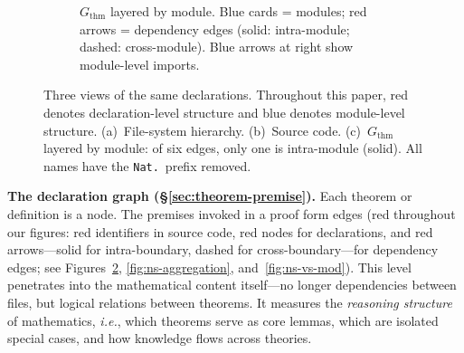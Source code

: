 \begin{figure}[!htb]
\begin{subfigure}[b]{\textwidth}
\caption{$G_{\mathrm{thm}}$ layered by module. \textcolor{blue!60!black}{Blue cards} = modules; \textcolor{red!70!black}{red arrows} = dependency edges (solid: intra-module; dashed: cross-module). \textcolor{blue!60!black}{Blue arrows} at right show module-level imports.}
\label{fig:dep-view}
\end{subfigure}
\caption{Three views of the same declarations. Throughout this paper, \textcolor{red!70!black}{red} denotes declaration-level structure and \textcolor{blue!60!black}{blue} denotes module-level structure. (a)~File-system hierarchy. (b)~Source code. (c)~$G_{\mathrm{thm}}$ layered by module: of six edges, only one is intra-module (solid). All names have the \texttt{Nat.}\ prefix removed.}
\label{fig:module-region}
\end{figure}

\medskip
\noindent\textbf{The declaration graph (\S\ref{sec:theorem-premise}).}
Each theorem or definition is a node. The premises invoked in a proof form edges (\textcolor{red!70!black}{red} throughout our figures: \textcolor{red!70!black}{red identifiers} in source code, \textcolor{red!70!black}{red nodes} for declarations, and \textcolor{red!70!black}{red arrows}---solid for intra-boundary, dashed for cross-boundary---for dependency edges; see Figures~\ref{fig:module-region}, \ref{fig:ns-aggregation}, and~\ref{fig:ns-vs-mod}). This level penetrates into the mathematical content itself---no longer dependencies between files, but logical relations between theorems. It measures the \emph{reasoning structure} of mathematics, \emph{i.e.}, which theorems serve as core lemmas, which are isolated special cases, and how knowledge flows across theories.


